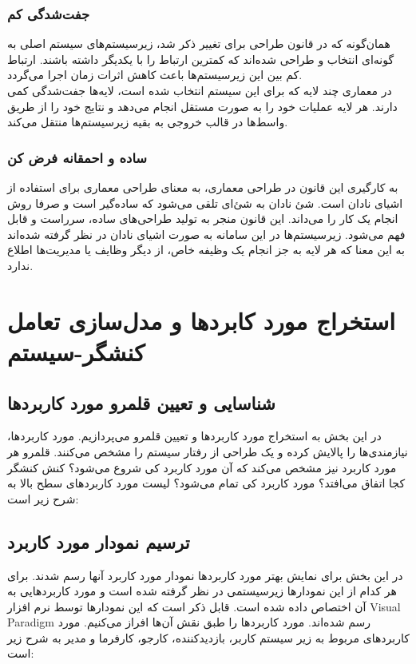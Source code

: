\documentclass[12pt]{article}
\begin{document}
	\subsubsection{جفت‌شدگی کم}
	همان‌گونه که در قانون طراحی برای تغییر ذکر شد، زیرسیستم‌های سیستم اصلی به گونه‌ای انتخاب و طراحی شده‌اند که کمترین ارتباط را با یکدیگر داشته باشند. ارتباط کم بین این زیرسیستم‌ها باعث کاهش اثرات زمان اجرا می‌گردد. \\
	در معماری چند لایه که برای این سیستم انتخاب شده است، لایه‌ها جفت‌شدگی کمی دارند. هر لایه عملیات خود را به صورت مستقل انجام می‌دهد و نتایج خود را از طریق واسط‌ها در قالب خروجی به بقیه زیرسیستم‌ها منتقل می‌کند.

	\subsubsection{ساده و احمقانه فرض کن}
	به کارگیری این قانون در طراحی معماری، به معنای طراحی معماری برای استفاده از اشیای نادان است. شئ نادان به شئ‌ای تلقی می‌شود که ساده‌گیر است و صرفا روش انجام یک کار را می‌داند. این قانون منجر به تولید طراحی‌های ساده، سرراست و قابل فهم می‌شود. زیرسیستم‌ها در این سامانه به صورت اشیای نادان در نظر گرفته شده‌اند به این معنا که هر لایه به جز انجام یک وظیفه خاص، از دیگر وظایف یا مدیریت‌ها اطلاع ندارد.

	\newpage
	\section{استخراج مورد کابردها و مدل‌سازی تعامل کنشگر-سیستم}
	\subsection{شناسایی و تعیین قلمرو مورد کاربردها}
	در این بخش به استخراج مورد کاربردها و تعیین قلمرو می‌پردازیم. مورد کاربردها، نیازمندی‌ها را پالایش کرده و یک طراحی از رفتار سیستم را مشخص می‌کنند. قلمرو هر مورد کاربرد نیز مشخص می‌کند که آن مورد کاربرد کی شروع می‌شود؟ کنش کنشگر کجا اتفاق می‌افتد؟ مورد کاربرد کی تمام می‌شود؟
	لیست مورد کاربردهای سطح بالا به شرح زیر است:

	\subsection{ترسیم نمودار مورد کاربرد}
	در این بخش برای نمایش بهتر مورد کاربردها نمودار مورد کاربرد آنها رسم شدند. برای هر کدام از این نمودارها زیرسیستمی در نظر گرفته شده است و مورد کاربرد‌هایی به آن اختصاص داده شده است. قابل ذکر است که این نمودارها توسط نرم افزار Visual Paradigm رسم شده‌اند. مورد کاربرد‌ها را طبق نقش آن‌ها افراز می‌کنیم. مورد کاربردهای مربوط به زیر سیستم کاربر، بازدیدکننده، کارجو، کارفرما و مدیر به شرح زیر است:
\end{document}

